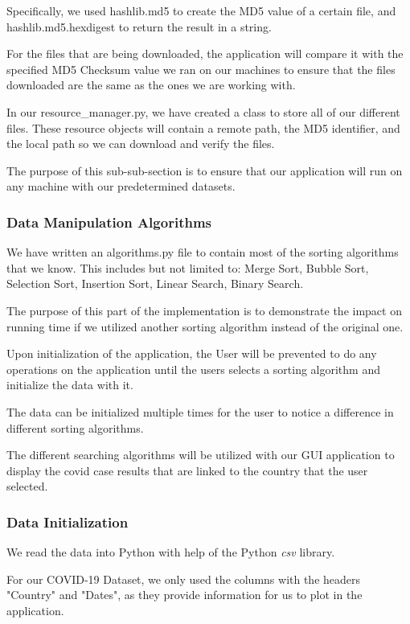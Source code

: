 \documentclass[fontsize=11pt]{article}
\begin{document}
    Specifically, we used hashlib.md5 to create the MD5 value of a certain file, and hashlib.md5.hexdigest to return the result in a string.

    For the files that are being downloaded, the application will compare it with the specified MD5 Checksum value we ran on our machines to ensure that the files downloaded are the same as the ones we are working with.

    In our resource\_manager.py, we have created a class to store all of our different files. These resource objects will contain a remote path, the MD5 identifier, and the local path so we can download and verify the files.

    The purpose of this sub-sub-section is to ensure that our application will run on any machine with our predetermined datasets.

    \subsubsection{Data Manipulation Algorithms}

    We have written an algorithms.py file to contain most of the sorting algorithms that we know. This includes but not limited to: Merge Sort, Bubble Sort, Selection Sort, Insertion Sort, Linear Search, Binary Search.

    The purpose of this part of the implementation is to demonstrate the impact on running time if we utilized another sorting algorithm instead of the original one.

    Upon initialization of the application, the User will be prevented to do any operations on the application until the users selects a sorting algorithm and initialize the data with it.

    The data can be initialized multiple times for the user to notice a difference in different sorting algorithms.

    The different searching algorithms will be utilized with our GUI application to display the covid case results that are linked to the country that the user selected.

    \subsubsection{Data Initialization}

    We read the data into Python with help of the Python \emph{csv} library.

    For our COVID-19 Dataset, we only used the columns with the headers "Country" and "Dates", as they provide information for us to plot in the application.
\end{document}
